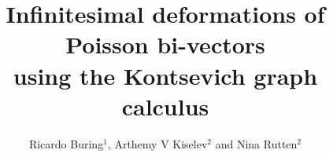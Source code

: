 \documentclass[a4paper]{jpconf}%
\theoremstyle{definition}
\theoremstyle{remark}
\begin{document}
\pagestyle{plain}

\title{Infinitesimal deformations of Poisson bi\/-\/vectors\\ %
using the Kontsevich graph calculus}

\author{Ricardo Buring${}^1$, Arthemy V Kiselev${}^2$ and Nina Rutten${}^2$}

\address{${}^1$ %
Institut f\"ur Mathematik, %
Johannes Gutenberg\/--\/Uni\-ver\-si\-t\"at,
Staudingerweg~9, %
\mbox{D-\/55128} Mainz, Germany}
\address{${}^2$ Johann Ber\-nou\-lli Institute for Mathematics and Computer Science, University of Groningen,
P.O.~Box 407, 9700~AK Groningen, The Netherlands}





\end{document}
